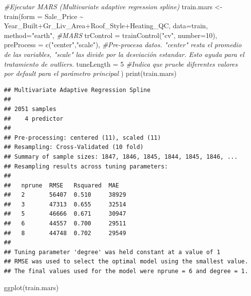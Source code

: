 \documentclass[
]{article}
\newenvironment{Shaded}{\begin{snugshade}}{\end{snugshade}}
\newcommand{\AttributeTok}[1]{\textcolor[rgb]{0.77,0.63,0.00}{#1}}
\newcommand{\CommentTok}[1]{\textcolor[rgb]{0.56,0.35,0.01}{\textit{#1}}}
\newcommand{\DecValTok}[1]{\textcolor[rgb]{0.00,0.00,0.81}{#1}}
\newcommand{\FunctionTok}[1]{\textcolor[rgb]{0.00,0.00,0.00}{#1}}
\newcommand{\NormalTok}[1]{#1}
\newcommand{\OtherTok}[1]{\textcolor[rgb]{0.56,0.35,0.01}{#1}}
\newcommand{\SpecialCharTok}[1]{\textcolor[rgb]{0.00,0.00,0.00}{#1}}
\newcommand{\StringTok}[1]{\textcolor[rgb]{0.31,0.60,0.02}{#1}}
\begin{document}
\begin{Shaded}
\begin{Highlighting}[]
\CommentTok{\#Ejecutar MARS (Multivariate adaptive regression spline)}
\NormalTok{train.mars }\OtherTok{\textless{}{-}} \FunctionTok{train}\NormalTok{(}\AttributeTok{form =}\NormalTok{ Sale\_Price }\SpecialCharTok{\textasciitilde{}}\NormalTok{ Year\_Built}\SpecialCharTok{+}\NormalTok{Gr\_Liv\_Area}\SpecialCharTok{+}\NormalTok{Roof\_Style}\SpecialCharTok{+}\NormalTok{Heating\_QC, }
                    \AttributeTok{data=}\NormalTok{train, }
                    \AttributeTok{method=}\StringTok{"earth"}\NormalTok{, }\CommentTok{\#MARS}
                    \AttributeTok{trControl =} \FunctionTok{trainControl}\NormalTok{(}\StringTok{"cv"}\NormalTok{, }\AttributeTok{number=}\DecValTok{10}\NormalTok{),}
                    \AttributeTok{preProcess =} \FunctionTok{c}\NormalTok{(}\StringTok{"center"}\NormalTok{,}\StringTok{"scale"}\NormalTok{), }\CommentTok{\#Pre{-}procesa datos. "center" resta el promedio de las variables, "scale" las divide por la desviación estandar. Esto ayuda para el tratamiento de outliers.}
                    \AttributeTok{tuneLength =} \DecValTok{5} \CommentTok{\#Indica que pruebe diferentes valores por default para el parámetro principal}
\NormalTok{)}
\FunctionTok{print}\NormalTok{(train.mars)}
\end{Highlighting}
\end{Shaded}

\begin{verbatim}
## Multivariate Adaptive Regression Spline 
## 
## 2051 samples
##    4 predictor
## 
## Pre-processing: centered (11), scaled (11) 
## Resampling: Cross-Validated (10 fold) 
## Summary of sample sizes: 1847, 1846, 1845, 1844, 1845, 1846, ... 
## Resampling results across tuning parameters:
## 
##   nprune  RMSE   Rsquared  MAE  
##   2       56407  0.510     38929
##   3       47313  0.655     32514
##   5       46666  0.671     30947
##   6       44557  0.700     29511
##   8       44748  0.702     29549
## 
## Tuning parameter 'degree' was held constant at a value of 1
## RMSE was used to select the optimal model using the smallest value.
## The final values used for the model were nprune = 6 and degree = 1.
\end{verbatim}

\begin{Shaded}
\begin{Highlighting}[]
\FunctionTok{ggplot}\NormalTok{(train.mars)}
\end{Highlighting}
\end{Shaded}
\end{document}
